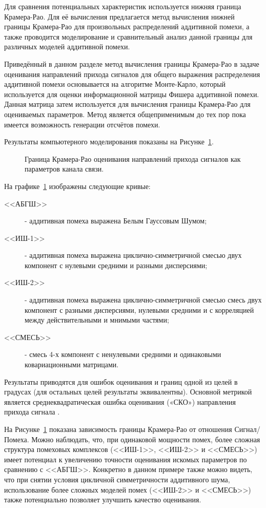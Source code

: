 Для сравнения потенциальных характеристик используется нижняя граница Крамера-Рао. Для её вычисления предлагается метод вычисления нижней границы Крамера-Рао для произвольных распределений аддитивной помехи, а также проводится моделирование и сравнительный анализ данной границы для различных моделей аддитивной помехи.

Приведённый в данном разделе метод вычисления границы Крамера-Рао в задаче оценивания направлений прихода сигналов для общего выражения распределения аддитивной помехи основывается на алгоритме Монте-Карло, который используется для оценки информационной матрицы Фишера аддитивной помехи. Данная матрица затем используется для вычисления границы Крамера-Рао для оцениваемых параметров. Метод является общеприменимым до тех пор пока имеется возможность генерации отсчётов помехи.

Результаты компьютерного моделирования показаны на Рисунке~\ref{fig:ch2/sec3:ngmix}.
\begin{figure}[ht]
	\caption{Граница Крамера-Рао оценивания направлений прихода сигналов как параметров канала связи.}
	\label{fig:ch2/sec3:ngmix}
\end{figure}

На графике~\ref{fig:ch2/sec3:ngmix} изображены следующие кривые:
\begin{description}
	\item[<<АБГШ>>] - аддитивная помеха выражена Белым Гауссовым Шумом;
	\item[<<ИШ-1>>] - аддитивная помеха выражена циклично-симметричной смесью двух компонент с нулевыми средними и разными дисперсиями;
	\item[<<ИШ-2>>] - аддитивная помеха выражена циклично-симметричной смесью смесь двух компонент с разными дисперсиями, нулевыми средними и с корреляцией между действительными и мнимыми частями;
	\item[<<СМЕСЬ>>] - смесь 4-х компонент с ненулевыми средними и одинаковыми ковариационными матрицами.
\end{description}

Результаты приводятся для ошибок оценивания и границ одной из целей в градусах (для остальных целей результаты эквивалентны). Основной метрикой является среднеквадратическая ошибка оценивания («СКО») направления прихода сигнала .

На Рисунке~\ref{fig:ch2/sec3:ngmix} показана зависимость границы Крамера-Рао от отношения Сигнал/Помеха. Можно наблюдать, что, при одинаковой мощности помех, более сложная структура помеховых комплексов (<<ИШ-1>>, <<ИШ-2>> и <<СМЕСЬ>>) имеет потенциал к увеличению точности оценивания искомых параметров по сравнению с <<АБГШ>>. Конкретно в данном примере также можно видеть, что при снятии условия цикличной симметричности аддитивного шума, использование более сложных моделей помех (<<ИШ-2>> и <<СМЕСЬ>>) также потенциально позволяет улучшить качество оценивания.

